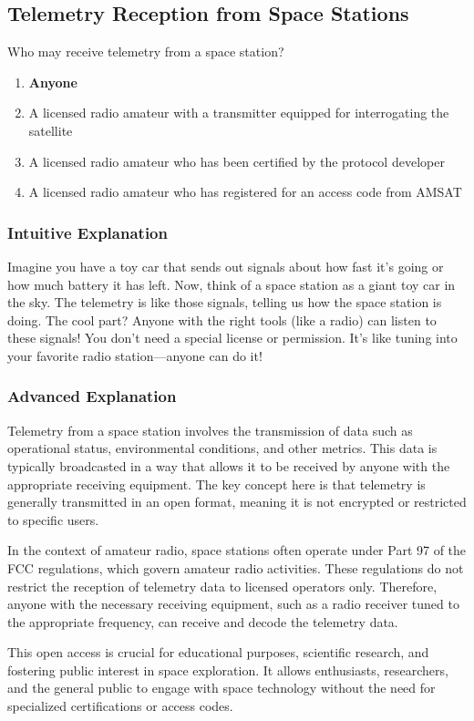 \subsection{Telemetry Reception from Space Stations}
\label{T8B11}

\begin{tcolorbox}[colback=gray!10!white,colframe=black!75!black,title=T8B11]
Who may receive telemetry from a space station?
\begin{enumerate}[label=\Alph*.]
    \item \textbf{Anyone}
    \item A licensed radio amateur with a transmitter equipped for interrogating the satellite
    \item A licensed radio amateur who has been certified by the protocol developer
    \item A licensed radio amateur who has registered for an access code from AMSAT
\end{enumerate}
\end{tcolorbox}

\subsubsection*{Intuitive Explanation}
Imagine you have a toy car that sends out signals about how fast it's going or how much battery it has left. Now, think of a space station as a giant toy car in the sky. The telemetry is like those signals, telling us how the space station is doing. The cool part? Anyone with the right tools (like a radio) can listen to these signals! You don’t need a special license or permission. It’s like tuning into your favorite radio station—anyone can do it!

\subsubsection*{Advanced Explanation}
Telemetry from a space station involves the transmission of data such as operational status, environmental conditions, and other metrics. This data is typically broadcasted in a way that allows it to be received by anyone with the appropriate receiving equipment. The key concept here is that telemetry is generally transmitted in an open format, meaning it is not encrypted or restricted to specific users. 

In the context of amateur radio, space stations often operate under Part 97 of the FCC regulations, which govern amateur radio activities. These regulations do not restrict the reception of telemetry data to licensed operators only. Therefore, anyone with the necessary receiving equipment, such as a radio receiver tuned to the appropriate frequency, can receive and decode the telemetry data.

This open access is crucial for educational purposes, scientific research, and fostering public interest in space exploration. It allows enthusiasts, researchers, and the general public to engage with space technology without the need for specialized certifications or access codes.

